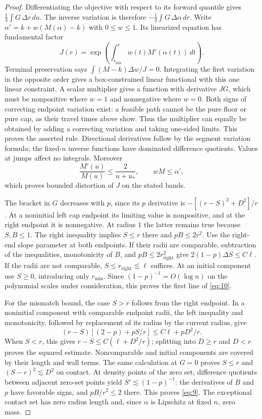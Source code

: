\begin{proof}
Differentiating the objective with respect to its forward quantile gives
$\frac14\int G\,\Delta r\,du$.  The inverse variation is therefore
$-\frac14\int G\,\Delta\alpha\,dr$.  Write
$\alpha'=k+w(M(\alpha)-k)$ with $0\le w\le1$.  Its linearized
equation has fundamental factor
\[
 J(r)=\exp\left(\int_{r_{\min}}^r w(t)M'(\alpha(t))\,dt\right).
\]
Terminal preservation says
$\int(M-k)\Delta w/J=0$.  Integrating the first variation in the
opposite order gives a box-constrained linear functional with this one
linear constraint.  A scalar multiplier gives a function with derivative
$JG$, which must be nonpositive where $w=1$ and nonnegative where $w=0$.
Both signs of correcting endpoint variation exist: a feasible path
cannot be the pure floor or pure cap, as their travel times above show.
Thus the multiplier can equally be obtained by adding a correcting
variation and taking one-sided limits.  This proves the asserted rule.
Directional derivatives follow by the segment variation formula; the
fixed-$n$ inverse functions have dominated difference quotients.  Values
at jumps affect no integrals.  Moreover
\[
 \frac{M'(u)}{M(u)}\le\frac2{u+u_*},\qquad wM\le\alpha',
\]
which proves bounded distortion of $J$ on the stated bands.

The bracket in $G$ decreases with $p$, since its $p$ derivative is
$-[(r-S)^2+D^2]/r$.  At a noninitial left cap endpoint its limiting
value is nonpositive, and at the right endpoint it is nonnegative.
At radius $1$ the latter remains true because $S,B\le1$.
The right inequality implies $S\le r$ there and $pB\le2r^2$.
Use the right-end slope parameter at both endpoints.  If their radii
are comparable, subtraction of the inequalities, monotonicity of $B$,
and $pB\le2r_{\mathrm{right}}^2$ give
$2(1-p)\Delta S\le C\ell$.
If the radii are not comparable, $S\le r_{\mathrm{right}}\lesssim\ell$
suffices.  At an initial component use $S\ge0$, introducing only
$r_{\min}$.  Since $(1-p)^{-1}=O(\log n)$ on the polynomial scales
under consideration, this proves the first line of \eqref{eq:10}.

For the mismatch bound, the case $S>r$ follows from the right endpoint.
In a noninitial component with comparable endpoint radii, the left
inequality and monotonicity, followed by replacement of its radius by
the current radius, give
\[
 (r-S)\left[(2-p)+pS/r\right]\le C\ell+pD^2/r.
\]
When $S<r$, this gives $r-S\le C(\ell+D^2/r)$; splitting into
$D\ge r$ and $D<r$ proves the squared estimate.  Noncomparable and
initial components are covered by their length and wall terms.
The same calculation at $G=0$ proves $S\le r$ and
$(S-r)^2\lesssim D^2$ on contact.  At density points of the zero set,
difference quotients between adjacent zero-set points yield
$S'\lesssim(1-p)^{-1}$: the derivatives of $B$ and $p$ have favorable
signs, and $pB/r^2\le2$ there.  This proves \eqref{eq:9}.
The exceptional contact set has zero radius length and, since $\alpha$
is Lipschitz at fixed $n$, zero mass.


\end{proof}

